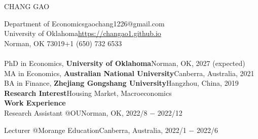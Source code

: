 \documentclass[10pt,letterpaper]{article}
\begin{document}
	\begin{center}
		{\Large CHANG GAO}
	\end{center}
	\noindent Department of Economics\hfill gaochang1226@gmail.com\medskip\\
	University of Oklahoma\hfill\href{https://changao1.github.io}{https://changao1.github.io}\medskip\\
Norman, OK   73019\hfill+1 (650) 732 6533\bigskip\\
	\medskip\\
	PhD in Economics, {\bf University of Oklahoma}\hfill Norman, OK, 2027 (expected)\medskip\\
    MA in Economics, {\bf Australian National University}\hfill Canberra, Australia, 2021\medskip\\
	BA in Finance, {\bf Zhejiang Gongshang University}\hfill Hangzhou, China, 2019\bigskip\\
	{\bf Research Interest}\hfill Housing Market, Macroeconomics\bigskip\\
	{\bf Work Experience}\medskip\\
		Research Assistant @OU\hfill Norman, OK, 2022/8 $-$ 2022/12\smallskip
		
		\noindent Lecturer @Morange Education\hfill Canberra, Australia, 2022/1 $-$ 2022/6\smallskip
		
\end{document}
